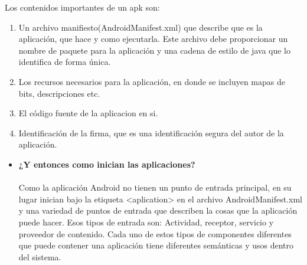 \documentclass[a4paper]{article}
\begin{document}
Los contenidos importantes de un apk son:
\begin{enumerate}

\item	Un archivo manifiesto(AndroidManifest.xml) que describe que es la aplicación, que hace y como ejecutarla. Este archivo debe proporcionar un nombre de paquete para la aplicación y una cadena de estilo de java que lo identifica de forma única.

\item Los recursos necesarios para la aplicación, en donde se incluyen mapas de bits, descripciones etc.

\item El código fuente de la aplicacion en si.

\item Identificación de la firma, que es una identificación segura del autor de la aplicación. 

\end{enumerate}


\begin{itemize}
\item \textbf{¿Y entonces como inician las aplicaciones?} \\ \\
Como la aplicación Android no tienen un punto de entrada principal, en su lugar inician bajo la etiqueta <aplication> en el archivo AndroidManifest.xml y una variedad de puntos de entrada que describen la cosas que la aplicación puede hacer. Esos tipos de entrada son: Actividad, receptor, servicio y proveedor de contenido. Cada uno de estos tipos de componentes diferentes que puede contener una aplicación tiene diferentes semánticas y usos dentro del sistema. 
\end{itemize}
\end{document}
